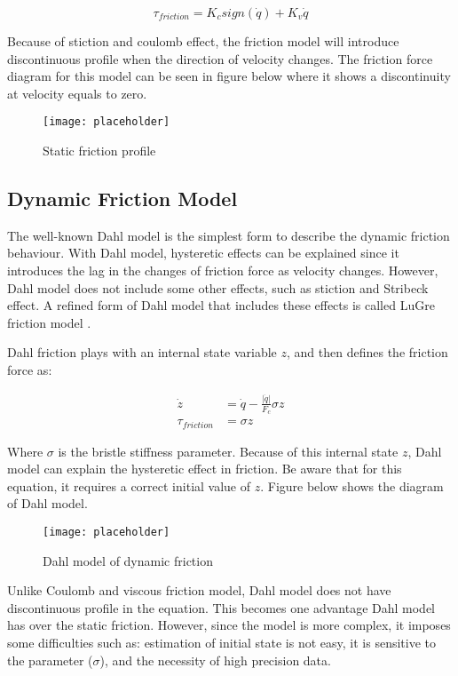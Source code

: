 \begin{equation}
  \tau_{friction} = K_{c} sign\left(\dot{q}\right) + K_{v} \dot{q}
\end{equation}

Because of stiction and coulomb effect, the friction model will introduce discontinuous profile when the direction of velocity changes. The friction force diagram for this model can be seen in figure below where it shows a discontinuity at velocity equals to zero.

\begin{figure}[h]
    \centering
    \texttt{[image: placeholder]}
    \caption{Static friction profile}
    \label{fig:static fric}
\end{figure}


\subsection{Dynamic Friction Model}
The well-known Dahl model is the simplest form to describe the dynamic friction behaviour. With Dahl model, hysteretic effects can be explained since it introduces the lag in the changes of friction force as velocity changes. However, Dahl model does not include some other effects, such as stiction and Stribeck effect. A refined form of Dahl model that includes these effects is called LuGre friction model \cite{Bona05}.

Dahl friction plays with an internal state variable $z$, and then defines the friction force as:

\begin{align}
  \dot{z} &= \dot{q} - \frac{\left|\dot{q}\right|}{F_{c}} \sigma z \\
  \tau_{friction} &= \sigma z
\end{align}

Where $\sigma$ is the bristle stiffness parameter. Because of this internal state $z$, Dahl model can explain the hysteretic effect in friction. Be aware that for this equation, it requires a correct initial value of $z$. Figure below shows the diagram of Dahl model.  

\begin{figure}[h]
    \centering
    \texttt{[image: placeholder]}
    \caption{Dahl model of dynamic friction}
    \label{fig:Dahl fric}
\end{figure}

Unlike Coulomb and viscous friction model, Dahl model does not have discontinuous profile in the equation. This becomes one advantage Dahl model has over the static friction. However, since the model is more complex, it imposes some difficulties such as: estimation of initial state is not easy, it is sensitive to the parameter ($\sigma$), and the necessity of high precision data. 
